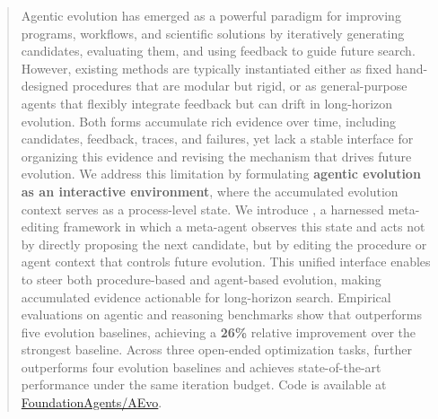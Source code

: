 \begin{abstract}


Agentic evolution has emerged as a powerful paradigm for improving programs, workflows, and scientific solutions by iteratively generating candidates, evaluating them, and using feedback to guide future search.
However, existing methods are typically instantiated either as fixed hand-designed procedures that are modular but rigid, or as general-purpose agents that flexibly integrate feedback but can drift in long-horizon evolution.
Both forms accumulate rich evidence over time, including candidates, feedback, traces, and failures, yet lack a stable interface for organizing this evidence and revising the mechanism that drives future evolution.
We address this limitation by formulating \textbf{agentic evolution as an interactive environment}, where the accumulated evolution context serves as a process-level state.
We introduce \method, a harnessed meta-editing framework in which a meta-agent observes this state and acts not by directly proposing the next candidate, but by editing the procedure or agent context that controls future evolution.
This unified interface enables \method to steer both procedure-based and agent-based evolution, making accumulated evidence actionable for long-horizon search.
Empirical evaluations on agentic and reasoning benchmarks show that \method outperforms five evolution baselines, achieving a \textbf{26\%} relative improvement over the strongest baseline.
Across three open-ended optimization tasks, \method further outperforms four evolution baselines and achieves state-of-the-art performance under the same iteration budget.
Code is available at \href{https://github.com/FoundationAgents/AEvo}{FoundationAgents/AEvo}.
\end{abstract}
